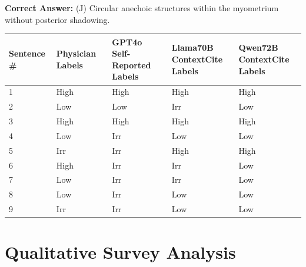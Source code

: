 \documentclass[11pt]{article}
\begin{document}
\begin{tcolorbox}[colback=blue!3!white, colframe=blue!50!white,
                  title=Example of QA Data (from MedXpert QA ID0200), left=10mm, breakable]
\bigskip
\textbf{Correct Answer:} (J) Circular anechoic structures within the myometrium without posterior shadowing.

\bigskip
\noindent

\medskip
\centering
\setlength{\tabcolsep}{4pt}
\begin{tabular}{|l|l|l|l|l|}
  \toprule
  Sentence \# & Physician Labels & \makecell[c]{GPT4o \\ Self-Reported Labels} & \makecell[c]{Llama70B \\ContextCite Labels}  & \makecell[c]{Qwen72B \\ContextCite Labels} \\
  \midrule
  1 & High & High & High & High\\
  2 & Low  & Low  & Irr & Low \\
  3 & High  & High & High & High \\
  4 & Low  & Irr  & Low & Low  \\   
  5 & Irr  & Irr  & High & High \\   
  6 & High  & Irr  & Irr  & Low \\   
  7 & Low  & Irr  & Irr  & Low \\   
  8 & Low  & Irr  & Low  & Low \\   
  9 & Irr  & Irr  & Low  & Low \\   
  \bottomrule         
\end{tabular}
\end{tcolorbox}

\section{Qualitative Survey Analysis}
\end{document}
